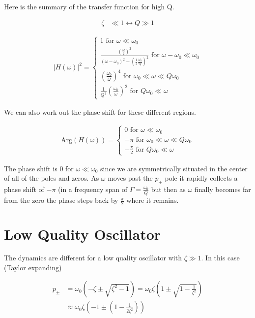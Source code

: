 \documentclass[12pt]{article}
\begin{document}
Here is the summary of the transfer function for high Q.

\begin{align}
\zeta &\ll 1 \leftrightarrow Q \gg 1
\end{align}

\begin{align}
|H(\omega)|^2 =
\begin{cases}
1 \text{ for } \omega \ll \omega_0\\
\frac{\left(\frac{\omega}{2} \right)^2}{(\omega-\omega_0)^2 + \left(\frac{1}{2} \frac{\omega_0}{Q}\right)^2} \text{ for } \omega - \omega_0 \ll \omega_0\\
\left(\frac{\omega_0}{\omega} \right)^4 \text{ for } \omega_0 \ll \omega \ll Q \omega_0\\
\frac{1}{Q^2}\left(\frac{\omega_0}{\omega} \right)^2 \text{ for } Q \omega_0 \ll \omega
\end{cases}
\end{align}

We can also work out the phase shift for these different regions. 

\begin{align}
\text{Arg}(H(\omega)) =
\begin{cases}
0 \text{ for } \omega \ll \omega_0\\
-\pi \text{ for } \omega_0 \ll \omega \ll Q \omega_0\\
-\frac{\pi}{2} \text{ for } Q \omega_0 \ll \omega
\end{cases}
\end{align}

The phase shift is $0$ for $\omega \ll \omega_0$ since we are symmetrically situated in the center of all of the poles and zeros. As $\omega$ moves past the $p_+$ pole it rapidly collects a phase shift of $-\pi$ (in a frequency span of $\Gamma = \frac{\omega_0}{Q}$ but then as $\omega$ finally becomes far from the zero the phase steps back by $\frac{\pi}{2}$ where it remains.

\section{Low Quality Oscillator}

The dynamics are different for a low quality oscillator with $\zeta \gg 1$. In this case (Taylor expanding)

\begin{align}
p_{\pm} &= \omega_0(-\zeta \pm \sqrt{\zeta^2-1}) = \omega_0\zeta\left(1 \pm \sqrt{1-\frac{1}{\zeta^2}}\right)\\
& \approx \omega_0 \zeta\left(-1 \pm \left(1 - \frac{1}{2\zeta^2}\right) \right)
\end{align}
\end{document}
